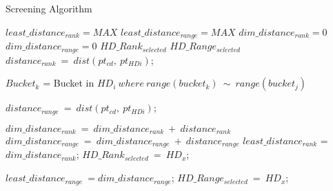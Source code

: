 \documentclass{article}
\begin{document}
\begin{algorithm}
\caption{Screening Algorithm}
\label{screening_algo}
\begin{algorithmic}[1]
\State $least\_distance_{rank} = MAX$
\State $least\_distance_{range} = MAX$
\State $dim\_distance_{rank} = 0$
\State $dim\_distance_{range} = 0$
\State $HD\_Rank_{selected}$
\State $HD\_Range_{selected}$
			\State 
				\State $distance_{rank}\ =\  dist(pt_{cd},\ pt_{HDi})$;
			\EndFor

			$Bucket_k$ = Bucket in $HD_i\  where\ range(bucket_k)\ \sim \  range(bucket_j)$
			
				\State $distance_{range}\ =\ dist(pt_{cd},\ pt_{HDi})$;  
			\EndFor
		\EndFor
 	 		
		\State $dim\_distance_{rank}\  =\  dim\_distance_{rank} \ + \ distance_{rank}$
		\State $dim\_distance_{range}\  =\  dim\_distance_{range} \ + \ distance_{range}$ 
	\EndFor
 			\State $least\_distance_{rank}$ = $dim\_distance_{rank}$;
			\State $HD\_Rank_{selected}\ = \ HD_x$;
	\EndIf
   	 
   		\State $least\_distance_{range}\ = dim\_distance_{range}$;
   	 	\State $HD\_Range_{selected}\ = \ HD_x$;
	\EndIf
\EndFor
\EndProcedure
\end{algorithmic}
\end{algorithm}
\end{document}

